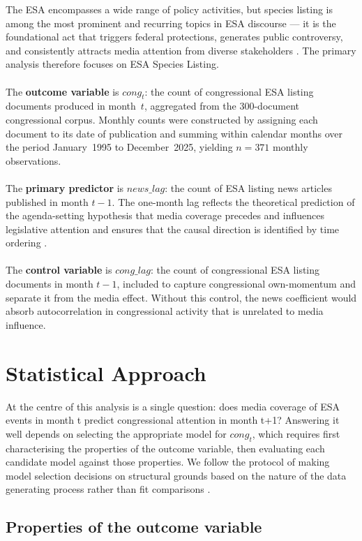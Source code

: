 \documentclass[11pt]{article}
\begin{document}
The ESA encompasses a wide range of policy activities, but species listing is among the most prominent and recurring topics in ESA discourse --- it is the foundational act that triggers federal protections,
generates public controversy, and consistently attracts media attention from diverse stakeholders \citep{Repetto2006}. The primary analysis therefore focuses on ESA Species Listing.\\
\\
The \textbf{outcome variable} is $\mathit{cong}_t$: the count of congressional ESA listing documents produced in month~$t$, aggregated from the 300-document congressional corpus. Monthly counts were
constructed by assigning each document to its date of publication and summing within calendar months over the period January~1995 to December~2025, yielding $n = 371$ monthly observations.\\
\\
The \textbf{primary predictor} is $\mathit{news\_lag}$: the count of ESA listing news articles published in month $t{-}1$. The one-month lag reflects the theoretical prediction of the agenda-setting hypothesis that media coverage precedes and influences legislative attention and ensures that the causal direction is identified by time ordering \citep{Granger1969}.\\
\\
The \textbf{control variable} is $\mathit{cong\_lag}$: the count of congressional ESA listing documents in month $t{-}1$, included to capture congressional own-momentum and separate it from the media effect. Without this control, the news coefficient would absorb autocorrelation in congressional activity that is unrelated to media influence.

\section{Statistical Approach}
At the centre of this analysis is a single question: does media coverage of ESA events in month t predict congressional attention in month t+1? Answering it well depends on selecting the appropriate model for $\mathit{cong}_t$, which requires first characterising the properties of the outcome variable, then evaluating each candidate model against those properties. We follow the protocol of making model selection decisions on structural grounds based on the nature of the data generating process rather than fit comparisons \citep{Zuur2010, Gelman2007}.

\subsection{Properties of the outcome variable}
\end{document}
